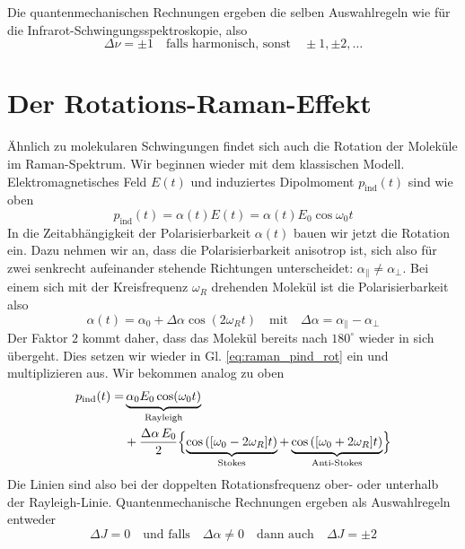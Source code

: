 Die quantenmechanischen Rechnungen ergeben die selben Auswahlregeln wie für die Infrarot-Schwingungsspektroskopie, also 
\begin{equation}
 \Delta \nu = \pm 1 \quad \text{falls harmonisch, sonst} \quad \pm 1, \pm 2, \dots  
\end{equation}



\section{Der Rotations-Raman-Effekt}

Ähnlich zu molekularen Schwingungen findet sich auch die Rotation der Moleküle im Raman-Spektrum. Wir beginnen wieder mit dem klassischen Modell. Elektromagnetisches Feld $E(t)$ und induziertes Dipolmoment $p_\text{ind}(t)$ sind wie oben
\begin{equation}
p_\text{ind}(t) = \alpha(t) E(t) = \alpha(t) E_0 \cos \omega_0 t \label{eq:raman_pind_rot}
\end{equation}
In die Zeitabhängigkeit der Polarisierbarkeit $\alpha(t)$ bauen wir jetzt die Rotation ein. Dazu nehmen wir an, dass die Polarisierbarkeit anisotrop ist, sich also für zwei senkrecht aufeinander stehende Richtungen unterscheidet: $\alpha_\parallel \neq \alpha_\perp$. Bei einem sich mit der Kreisfrequenz $\omega_R$ drehenden Molekül ist die Polarisierbarkeit also
\begin{equation}
\alpha(t) = \alpha_0 + \Delta \alpha \cos ( 2 \omega_R t) \quad \text{mit} \quad \Delta \alpha = \alpha_\parallel - \alpha_\perp
\end{equation}
Der Faktor $2$ kommt daher, dass das Molekül bereits nach $180^\circ$ wieder in sich übergeht. Dies setzen wir wieder in Gl. \ref{eq:raman_pind_rot} ein und multiplizieren aus. Wir bekommen analog zu oben
\begin{align}
p_\text{ind}(t) = & \underbrace{  \alpha_0 E_0 \cos(\omega_0 t) }_\text{Rayleigh} \\
& +   \frac{ \Delta \alpha \,  E_0 }{2} 
\Bigl\{ 
\underbrace{ \cos \left( [\omega_0 -2 \omega_R] t \right)}_\text{Stokes}  +  \underbrace{\cos \left( [\omega_0 + 2 \omega_R] t \right)  
}_\text{Anti-Stokes} 
\Bigr\} 
\nonumber
\end{align}
Die Linien sind also bei der doppelten Rotationsfrequenz ober- oder unterhalb der Rayleigh-Linie. Quantenmechanische Rechnungen ergeben als Auswahlregeln entweder
\begin{equation}
\Delta J = 0 \quad \text{und falls} \quad  \Delta \alpha \neq 0 \quad  \text{dann auch} \quad \Delta J = \pm 2
\end{equation}
